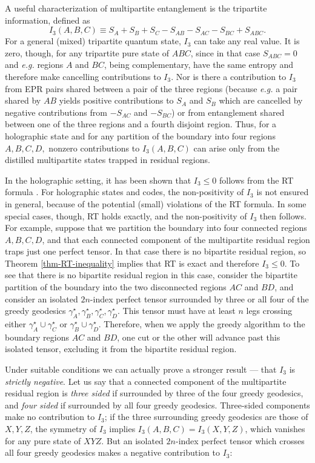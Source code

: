 \documentclass[12pt]{article}
\theoremstyle{plain}
\theoremstyle{plain}
\theoremstyle{plain}
\theoremstyle{plain}
\theoremstyle{result}
\theoremstyle{remark}
\theoremstyle{conjecture}
\theoremstyle{observation}
\theoremstyle{definition}
\theoremstyle{corollary}
\theoremstyle{definition}
\theoremstyle{definition}
\theoremstyle{assumption}
\theoremstyle{definition}
\theoremstyle{problem}
\theoremstyle{fact}
\newcommand{\be}{\begin{equation}}
\newcommand{\ee}{\end{equation}}
\begin{document}
A useful characterization of multipartite entanglement is the tripartite information, defined as
\be
I_3(A,B,C)\equiv S_A+S_B+S_C-S_{AB}-S_{AC}-S_{BC}+S_{ABC}.
\ee
For a general (mixed) tripartite quantum state, $I_3$ can take any real value. 
It is zero, though, for any tripartite pure state of $ABC$, since in that case $S_{ABC}=0$ and \textit{e.g.} regions $A$ and $BC$, being complementary, have the same entropy and therefore make cancelling contributions to $I_3$. 
Nor is there a contribution to $I_3$ from EPR pairs shared between a pair of the three regions (because \textit{e.g.} a pair shared by $AB$ yields positive contributions to $S_A$ and $S_B$ which are cancelled by negative contributions from $-S_{AC}$ and $-S_{BC}$) or from entanglement shared between one of the three regions and a fourth disjoint region. 
Thus, for a holographic state and for any partition of the boundary into four regions $A,B,C,D,$ nonzero contributions to $I_3(A,B,C)$ can arise only from the distilled multipartite states trapped in residual regions. 

In the holographic setting, it has been shown that $I_3 \leq 0$ follows from the RT formula \cite{Hayden13b}. 
For holographic states and codes, the non-positivity of $I_3$ is not ensured in general, because of the potential (small) violations of the RT formula. In some special cases, though, RT holds exactly, and the non-positivity of $I_3$ then follows. For example, suppose that we partition the boundary into four connected regions $A,B,C,D$, and that each connected component of the multipartite residual region traps just one perfect tensor. In that case there is no bipartite residual region, so Theorem \ref{thm-RT-inequality} implies that RT is exact and therefore $I_3 \leq 0$. 
To see that there is no bipartite residual region in this case, consider the bipartite partition of the boundary into the two disconnected regions $AC$ and $BD$, and consider an isolated $2n$-index perfect tensor surrounded by three or all four of the greedy geodesics $\gamma_A^\star, \gamma_B^\star,\gamma_C^\star,\gamma_D^\star$. 
This tensor must have at least $n$ legs crossing either $\gamma_A^\star \cup \gamma_C^\star$ or $\gamma_B^\star \cup \gamma_D^\star$. 
Therefore, when we apply the greedy algorithm to the boundary regions $AC$ and $BD$, one cut or the other will advance past this isolated tensor, excluding it from the bipartite residual region.

Under suitable conditions we can actually prove a stronger result  --- that $I_3$ is \textit{strictly negative}. Let us say that a connected component of the multipartite residual region is \textit{three sided} if surrounded by three of the four greedy geodesics, and \textit{four sided} if surrounded by all four greedy geodesics. Three-sided components make no contribution to $I_3$; if the three surrounding greedy geodesics are those of $X,Y,Z$, the symmetry of $I_3$ implies $I_3(A,B,C)= I_3(X,Y,Z)$, which vanishes for any pure state of $XYZ$. But an isolated $2n$-index perfect tensor which crosses all four greedy geodesics makes a negative contribution to $I_3$:
\end{document}
